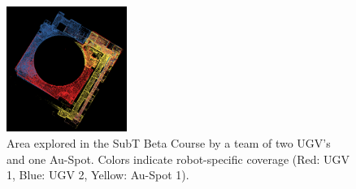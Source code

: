 \documentclass[letterpaper, 10pt, conference]{ieeeconf}      %
\begin{document}











\begin{figure}[t!]
  \centering
  \includegraphics[width=0.35\textwidth]{spot_iros/graphics/coverage_matteo.png}
  \caption{Area explored in the SubT Beta Course by a team of two UGV's and one Au-Spot. Colors indicate robot-specific coverage (Red: UGV 1, Blue: UGV 2, Yellow: Au-Spot 1).}
  \label{fig:exploration_planner_topview}
\end{figure}
\end{document}
